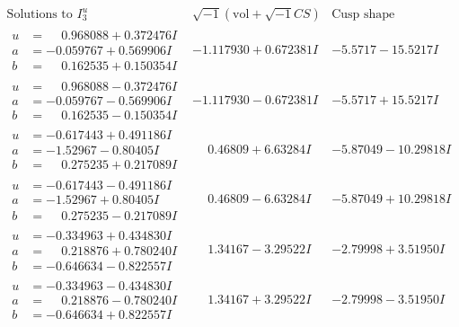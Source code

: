 \documentclass[1p]{elsarticle_modified}
\theoremstyle{definition}
\newcommand{\I}{\sqrt{-1}}
\begin{document}
$$\begin{array}{c|c|c}  
\text{Solutions to }I^u_{3}& \I (\text{vol} + \sqrt{-1}CS) & \text{Cusp shape}\\
 \hline 
\begin{aligned}
u &= \phantom{-}0.968088 + 0.372476 I \\
a &= -0.059767 + 0.569906 I \\
b &= \phantom{-}0.162535 + 0.150354 I\end{aligned}
 & -1.117930 + 0.672381 I & -5.5717 - 15.5217 I \\ \hline\begin{aligned}
u &= \phantom{-}0.968088 - 0.372476 I \\
a &= -0.059767 - 0.569906 I \\
b &= \phantom{-}0.162535 - 0.150354 I\end{aligned}
 & -1.117930 - 0.672381 I & -5.5717 + 15.5217 I \\ \hline\begin{aligned}
u &= -0.617443 + 0.491186 I \\
a &= -1.52967 - 0.80405 I \\
b &= \phantom{-}0.275235 + 0.217089 I\end{aligned}
 & \phantom{-}0.46809 + 6.63284 I & -5.87049 - 10.29818 I \\ \hline\begin{aligned}
u &= -0.617443 - 0.491186 I \\
a &= -1.52967 + 0.80405 I \\
b &= \phantom{-}0.275235 - 0.217089 I\end{aligned}
 & \phantom{-}0.46809 - 6.63284 I & -5.87049 + 10.29818 I \\ \hline\begin{aligned}
u &= -0.334963 + 0.434830 I \\
a &= \phantom{-}0.218876 + 0.780240 I \\
b &= -0.646634 - 0.822557 I\end{aligned}
 & \phantom{-}1.34167 - 3.29522 I & -2.79998 + 3.51950 I \\ \hline\begin{aligned}
u &= -0.334963 - 0.434830 I \\
a &= \phantom{-}0.218876 - 0.780240 I \\
b &= -0.646634 + 0.822557 I\end{aligned}
 & \phantom{-}1.34167 + 3.29522 I & -2.79998 - 3.51950 I \\ \hline\begin{aligned}

\end{aligned}
\end{array}$$
\end{document}
